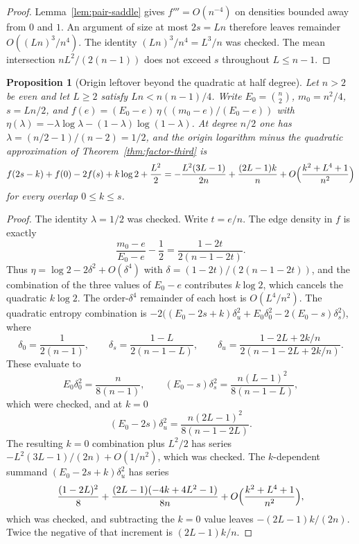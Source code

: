 \documentclass[11pt]{article}
\newtheorem{proposition}[theorem]{Proposition}
\begin{document}
\begin{proof}
Lemma~\ref{lem:pair-saddle} gives \(f'''=O(n^{-4})\) on densities bounded away from \(0\) and \(1\).
An argument of size at most \(2s=Ln\) therefore leaves remainder \(O((Ln)^3/n^4)\).
The identity \((Ln)^3/n^4=L^3/n\) was checked.
The mean intersection \(nL^2/(2(n-1))\) does not exceed \(s\) throughout \(L\le n-1\).
\end{proof}

\begin{proposition}[Origin leftover beyond the quadratic at half degree]
\label{prop:origin-leftover}
Let \(n>2\) be even and let \(L\ge 2\) satisfy \(Ln<n(n-1)/4\). Write \(E_0=\binom{n}{2}\), \(m_0=n^2/4\), \(s=Ln/2\), and \(f(e)=(E_0-e)\,\eta((m_0-e)/(E_0-e))\) with \(\eta(\lambda)=-\lambda\log\lambda-(1-\lambda)\log(1-\lambda)\).
At degree \(n/2\) one has \(\lambda=(n/2-1)/(n-2)=1/2\), and the origin logarithm minus the quadratic approximation of Theorem~\ref{thm:factor-third} is
\[
f(2s-k)+f(0)-2f(s)+k\log 2+\frac{L^2}{2}
=
-\frac{L^2(3L-1)}{2n}+\frac{(2L-1)k}{n}+O\Bigl(\frac{k^2+L^4+1}{n^2}\Bigr)
\]
for every overlap \(0\le k\le s\).
\end{proposition}

\begin{proof}
The identity \(\lambda=1/2\) was checked.
Write \(t=e/n\). The edge density in \(f\) is exactly
\[
\frac{m_0-e}{E_0-e}-\frac12
=
\frac{1-2t}{2(n-1-2t)}.
\]
Thus \(\eta=\log 2-2\delta^2+O(\delta^4)\) with \(\delta=(1-2t)/(2(n-1-2t))\), and the combination of the three values of \(E_0-e\) contributes \(k\log 2\), which cancels the quadratic \(k\log 2\).
The order-\(\delta^4\) remainder of each host is \(O(L^4/n^2)\).
The quadratic entropy combination is \(-2\bigl((E_0-2s+k)\delta_u^2+E_0\delta_0^2-2(E_0-s)\delta_s^2\bigr)\), where
\[
\delta_0=\frac1{2(n-1)},
\qquad
\delta_s=\frac{1-L}{2(n-1-L)},
\qquad
\delta_u=\frac{1-2L+2k/n}{2(n-1-2L+2k/n)}.
\]
These evaluate to
\[
E_0\delta_0^2=\frac{n}{8(n-1)},
\qquad
(E_0-s)\delta_s^2=\frac{n(L-1)^2}{8(n-1-L)},
\]
which were checked, and at \(k=0\)
\[
(E_0-2s)\delta_u^2=\frac{n(2L-1)^2}{8(n-1-2L)}.
\]
The resulting \(k=0\) combination plus \(L^2/2\) has series \(-L^2(3L-1)/(2n)+O(1/n^2)\), which was checked.
The \(k\)-dependent summand \((E_0-2s+k)\delta_u^2\) has series
\[
\frac{(1-2L)^2}{8}+\frac{(2L-1)(-4k+4L^2-1)}{8n}+O\Bigl(\frac{k^2+L^4+1}{n^2}\Bigr),
\]
which was checked, and subtracting the \(k=0\) value leaves \(-(2L-1)k/(2n)\).
Twice the negative of that increment is \((2L-1)k/n\).
\end{proof}
\end{document}
